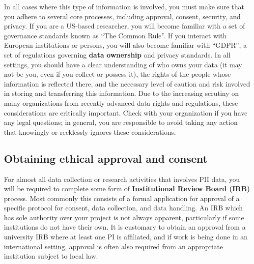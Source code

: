 In all cases where this type of information is involved,
you must make sure that you adhere to several core processes,
including approval, consent, security, and privacy.
If you are a US-based researcher, you will become familiar
with a set of governance standards known as ``The Common Rule''.
If you interact with European institutions or persons,
you will also become familiar with ``GDPR'',
a set of regulations governing \textbf{data ownership} and privacy standards.
In all settings, you should have a clear understanding of
who owns your data (it may not be you, even if you collect or possess it),
the rights of the people whose information is reflected there,
and the necessary level of caution and risk involved in
storing and transferring this information.
Due to the increasing scrutiny on many organizations
from recently advanced data rights and regulations,
these considerations are critically important.
Check with your organization if you have any legal questions;
in general, you are responsible to avoid taking any action that
knowingly or recklessly ignores these considerations.

\subsection{Obtaining ethical approval and consent}

For almost all data collection or research activities that involves PII data,
you will be required to complete some form of \textbf{Institutional Review Board (IRB)} process.
Most commonly this consists of a formal application for approval of a specific
protocol for consent, data collection, and data handling.
An IRB which has sole authority over your project is not always apparent,
particularly if some institutions do not have their own.
It is customary to obtain an approval from a university IRB
where at least one PI is affiliated,
and if work is being done in an international setting,
approval is often also required
from an appropriate institution subject to local law.

